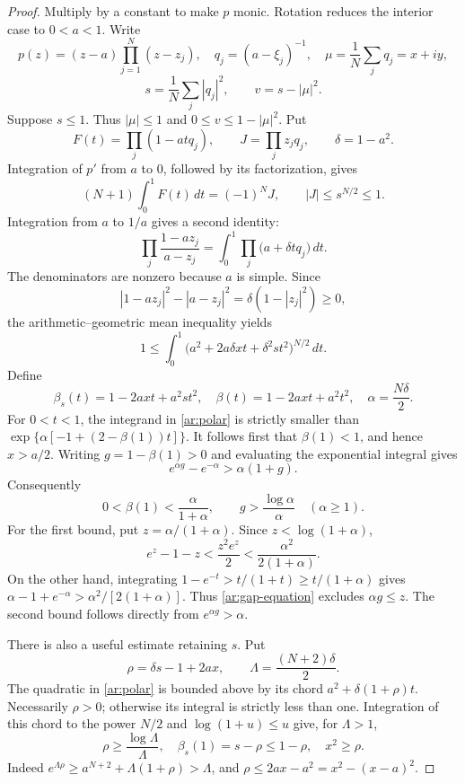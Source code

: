 \documentclass[11pt,reqno]{amsart}
\numberwithin{equation}{section}
\theoremstyle{definition}
\theoremstyle{remark}
\begin{document}
\begin{proof}
Multiply by a constant to make $p$ monic.
Rotation reduces the interior case to $0<a<1$. Write
\[
 p(z)=(z-a)\prod_{j=1}^N(z-z_j),\quad
 q_j=(a-\xi_j)^{-1},\quad
 \mu=\frac1N\sum_jq_j=x+iy,
\]
\[
 s=\frac1N\sum_j|q_j|^2,\qquad v=s-|\mu|^2.
\]
Suppose $s\le1$. Thus $|\mu|\le1$ and $0\le v\le1-|\mu|^2$.
Put
\[
 F(t)=\prod_j(1-atq_j),\qquad J=\prod_j z_jq_j,
 \qquad \delta=1-a^2.
\]
Integration of $p'$ from $a$ to $0$, followed by its factorization,
gives
\begin{equation}\label{ar:communication-origin}
 (N+1)\int_0^1F(t)\,dt=(-1)^NJ,\qquad |J|\le s^{N/2}\le1.
\end{equation}
Integration from $a$ to $1/a$ gives a second identity:
\begin{equation}\label{ar:communication-polar}
 \prod_j\frac{1-az_j}{a-z_j}
 =\int_0^1\prod_j\bigl(a+\delta t q_j\bigr)\,dt.
\end{equation}
The denominators are nonzero because $a$ is simple. Since
\[
 |1-az_j|^2-|a-z_j|^2=\delta(1-|z_j|^2)\ge0,
\]
the arithmetic--geometric mean inequality yields
\begin{equation}\label{ar:polar}
 1\le\int_0^1\bigl(a^2+2a\delta xt+\delta^2st^2\bigr)^{N/2}\,dt.
\end{equation}
Define
\[
 \beta_s(t)=1-2axt+a^2st^2,\quad
 \beta(t)=1-2axt+a^2t^2,\quad
 \alpha=\frac{N\delta}{2}.
\]
For $0<t<1$, the integrand in \eqref{ar:polar} is strictly smaller than
\(
 \exp\{\alpha[-1+(2-\beta(1))t]\}.
\)
It follows first that $\beta(1)<1$, and hence $x>a/2$.  Writing
$g=1-\beta(1)>0$ and evaluating the exponential integral gives
\begin{equation}\label{ar:gap-equation}
 e^{\alpha g}-e^{-\alpha}>\alpha(1+g).
\end{equation}
Consequently
\begin{equation}\label{ar:polar-gaps}
 0<\beta(1)<\frac{\alpha}{1+\alpha},\qquad
 g>\frac{\log\alpha}{\alpha}\quad(\alpha\ge1).
\end{equation}
For the first bound, put $z=\alpha/(1+\alpha)$. Since
$z<\log(1+\alpha)$,
\[
 e^z-1-z<\frac{z^2e^z}{2}<\frac{\alpha^2}{2(1+\alpha)}.
\]
On the other hand, integrating
$1-e^{-t}>t/(1+t)\ge t/(1+\alpha)$ gives
$\alpha-1+e^{-\alpha}>\alpha^2/[2(1+\alpha)]$.
Thus \eqref{ar:gap-equation} excludes $\alpha g\le z$.
The second bound follows directly from $e^{\alpha g}>\alpha$.

There is also a useful estimate retaining $s$. Put
\[
 \rho=\delta s-1+2ax,\qquad \Lambda=\frac{(N+2)\delta}{2}.
\]
The quadratic in \eqref{ar:polar} is bounded above by its chord
$a^2+\delta(1+\rho)t$.  Necessarily $\rho>0$; otherwise its integral
is strictly less than one. Integration of this chord to the power $N/2$
and $\log(1+u)\le u$ give, for $\Lambda>1$,
\begin{equation}\label{ar:rho}
 \rho\ge\frac{\log\Lambda}{\Lambda},\quad
 \beta_s(1)=s-\rho\le1-\rho,\quad
 x^2\ge\rho.
\end{equation}
Indeed $e^{\Lambda\rho}\ge a^{N+2}+\Lambda(1+\rho)>\Lambda$,
and $\rho\le2ax-a^2=x^2-(x-a)^2$.


\end{proof}
\end{document}
